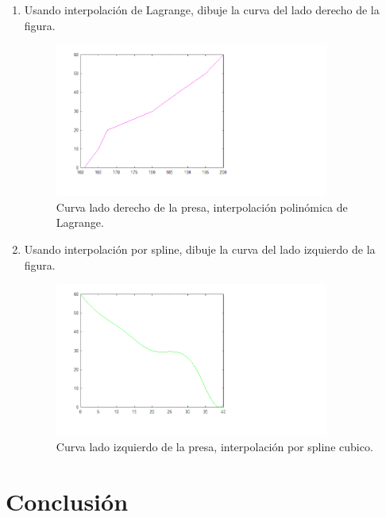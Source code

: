 \documentclass{udpreport}
\begin{document}
\begin{enumerate}
\begin{enumerate}
 \item Usando interpolación de Lagrange, dibuje la curva del lado derecho de la  figura.
 
  \begin{figure}[H]
    \centering
    \includegraphics[width=9cm]{curva_derecha_lagrange}
    \caption{Curva lado derecho de la presa, interpolación polinómica de Lagrange.} \label{fig:curva_derecha_lagrange}
  
\end{figure}
 \item Usando interpolación por spline, dibuje la curva del lado izquierdo de la  figura.
 \\
 \begin{figure}[H]
    \centering
    \includegraphics[width=9cm]{curvaizq_spline}
    \caption{Curva lado izquierdo de la presa, interpolación por spline cubico.} \label{fig:curvaizq_spline}
\end{figure}
 \end{enumerate}
 \end{enumerate}
 \newpage

    
    
\chapter{Conclusión}
      
\end{document}

